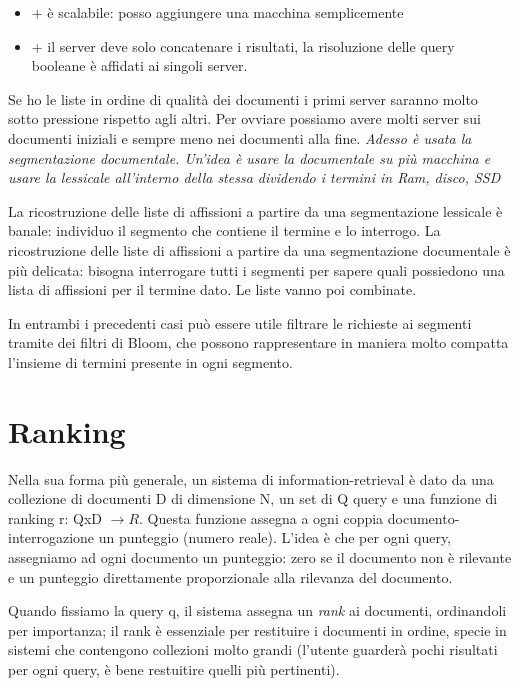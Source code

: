 \documentclass[12pt,italian]{report}
\begin{document}
\begin{itemize}
    \item + è scalabile: posso aggiungere una macchina semplicemente
    \item + il server deve solo concatenare i risultati, la risoluzione delle query booleane è affidati ai singoli server. 
\end{itemize}

Se ho le liste in ordine di qualità dei documenti i primi server saranno molto sotto pressione rispetto agli altri. Per ovviare possiamo avere molti server sui documenti iniziali e sempre meno nei documenti alla fine. 
\bigbreak
\noindent \textit{Adesso è usata la segmentazione documentale. Un'idea è usare la documentale su più macchina e usare la lessicale all'interno della stessa dividendo i termini in Ram, disco, SSD}
\bigbreak

La ricostruzione delle liste di affissioni a partire da una segmentazione lessicale è banale: individuo il segmento che contiene il termine e lo interrogo. La ricostruzione delle liste di affissioni a partire da una segmentazione documentale è più delicata: bisogna interrogare tutti i segmenti per sapere quali possiedono una lista di affissioni per il termine dato. Le liste vanno poi combinate.

In entrambi i precedenti casi può essere utile filtrare le richieste ai segmenti tramite dei filtri di Bloom, che possono rappresentare in maniera molto compatta l'insieme di termini presente in ogni segmento. 

\chapter{Ranking}
\label{cap:ranking}
Nella sua forma più generale, un sistema di information-retrieval è dato da una collezione di documenti D di dimensione N, un set di Q query e una funzione di ranking r: QxD $\rightarrow{R}$. Questa funzione assegna a ogni coppia documento-interrogazione un punteggio (numero reale). L'idea è che per ogni query, assegniamo ad ogni documento un punteggio: zero se il documento non è rilevante e un punteggio direttamente proporzionale alla rilevanza del documento. 

Quando fissiamo la query q, il sistema assegna un \textit{rank} ai documenti, ordinandoli per importanza; il rank è essenziale per restituire i documenti in ordine, specie in sistemi che contengono collezioni molto grandi (l'utente guarderà pochi risultati per ogni query, è bene restuitire quelli più pertinenti).
\end{document}
